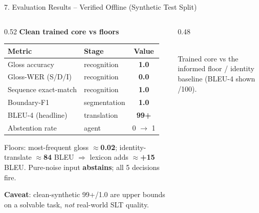 \documentclass[10pt,aspectratio=169]{beamer}
\begin{document}
\begin{frame}{7. Evaluation Results -- Verified Offline (Synthetic Test Split)}
\begin{columns}[T]
\begin{column}{0.52\textwidth}
\textbf{Clean trained core vs floors}
\begin{table}[h]
\centering\scriptsize
\begin{tabular}{llc}
\toprule
\textbf{Metric} & \textbf{Stage} & \textbf{Value} \\
\midrule
Gloss accuracy & recognition & \textbf{1.0} \\
Gloss-WER (S/D/I) & recognition & \textbf{0.0} \\
Sequence exact-match & recognition & \textbf{1.0} \\
Boundary-F1 & segmentation & \textbf{1.0} \\
BLEU-4 (headline) & translation & \textbf{99+} \\
Abstention rate & agent & 0 $\rightarrow$ 1 \\
\bottomrule
\end{tabular}
\end{table}
\scriptsize Floors: most-frequent gloss $\approx$\textbf{0.02}; identity-translate $\approx$\textbf{84} BLEU $\Rightarrow$ lexicon adds $\approx$\textbf{+15} BLEU. Pure-noise input \textbf{abstains}; all 5 decisions fire.

\vspace{0.05cm}
\scriptsize \textbf{Caveat}: clean-synthetic 99+/1.0 are upper bounds on a solvable task, \emph{not} real-world SLT quality.
\end{column}
\begin{column}{0.48\textwidth}
\centering
{}\\
\tiny Trained core vs the informed floor / identity baseline (BLEU-4 shown /100).
\end{column}
\end{columns}
\end{frame}
\end{document}
